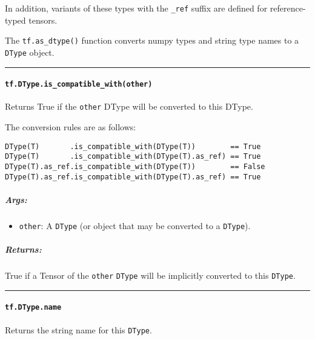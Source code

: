In addition, variants of these types with the \lstinline{_ref} suffix are
defined for reference-typed tensors.

The \lstinline{tf.as_dtype()} function converts numpy types and string
type names to a \lstinline{DType} object.

\begin{center}\rule{0.5\linewidth}{\linethickness}\end{center}

\paragraph{\texorpdfstring{\lstinline{tf.DType.is_compatible_with(other)}
}{tf.DType.is_compatible_with(other) }}\label{tf.dtype.isux5fcompatibleux5fwithother}

Returns True if the \lstinline{other} DType will be converted to this
DType.

The conversion rules are as follows:

\begin{lstlisting}
DType(T)       .is_compatible_with(DType(T))        == True
DType(T)       .is_compatible_with(DType(T).as_ref) == True
DType(T).as_ref.is_compatible_with(DType(T))        == False
DType(T).as_ref.is_compatible_with(DType(T).as_ref) == True
\end{lstlisting}

\subparagraph{Args: }\label{args-18}

\begin{itemize}
\tightlist
\item
  \lstinline{other}: A \lstinline{DType} (or object that may be converted to a
  \lstinline{DType}).
\end{itemize}

\subparagraph{Returns: }\label{returns-22}

True if a Tensor of the \lstinline{other} \lstinline{DType} will be implicitly
converted to this \lstinline{DType}.

\begin{center}\rule{0.5\linewidth}{\linethickness}\end{center}

\paragraph{\texorpdfstring{\lstinline{tf.DType.name}
}{tf.DType.name }}\label{tf.dtype.name}

Returns the string name for this \lstinline{DType}.

